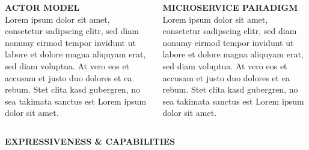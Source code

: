 \documentclass[final,hyperref={pdfpagelabels=true}]{beamer}
\begin{document}
\begin{frame}
\begin{columns}[t]
\begin{column}{.45\textwidth}
{        }
      \end{column}
    \end{columns}

    \vspace*{2\baselineskip}

    \begin{columns}[t]
    \begin{column}{.45\textwidth}
      \textsf{\textbf{ACTOR MODEL}} \\
      \vspace*{\baselineskip}
      {\lmodern
        Lorem ipsum dolor sit amet, consetetur sadipscing elitr, sed diam nonumy eirmod tempor invidunt ut labore et dolore magna aliquyam erat, sed diam voluptua. At vero eos et accusam et justo duo dolores et ea rebum. Stet clita kasd gubergren, no sea takimata sanctus est Lorem ipsum dolor sit amet. 
      }
    \end{column}

    \begin{column}{.45\textwidth}
      \textsf{\textbf{MICROSERVICE PARADIGM}} \\
      \vspace*{\baselineskip}
      {\lmodern
        Lorem ipsum dolor sit amet, consetetur sadipscing elitr, sed diam nonumy eirmod tempor invidunt ut labore et dolore magna aliquyam erat, sed diam voluptua. At vero eos et accusam et justo duo dolores et ea rebum. Stet clita kasd gubergren, no sea takimata sanctus est Lorem ipsum dolor sit amet. 
      }
    \end{column}
  \end{columns}

  \vspace*{2\baselineskip}
  
  \begin{columns}[t]
    \begin{column}{.45\textwidth}
      \textsf{\textbf{EXPRESSIVENESS \& CAPABILITIES}} \\
      \vspace*{\baselineskip}
      {\lmodern
        
}
\end{column}
\end{columns}
\end{frame}
\end{document}
